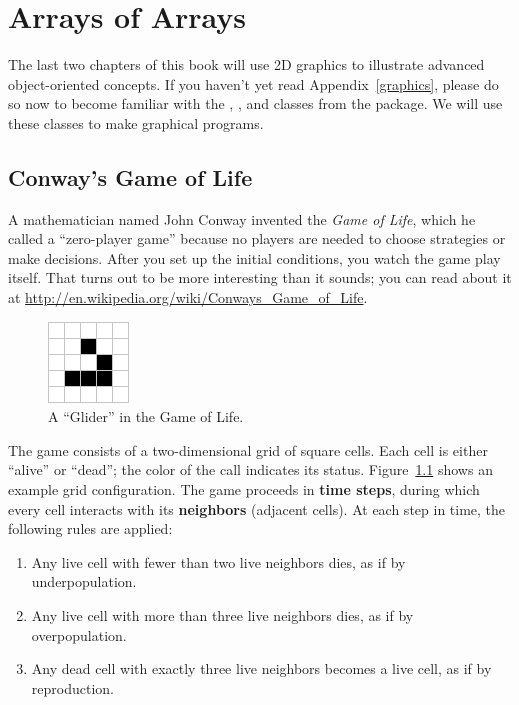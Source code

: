\chapter{Arrays of Arrays}

The last two chapters of this book will use 2D graphics to illustrate advanced object-oriented concepts.
If you haven't yet read Appendix~\ref{graphics}, please do so now to become familiar with the , , and  classes from the  package.
We will use these classes to make graphical programs.


\section{Conway's Game of Life}

A mathematician named John Conway invented the {\it Game of Life}, which he called a ``zero-player game'' because no players are needed to choose strategies or make decisions.
After you set up the initial conditions, you watch the game play itself.
That turns out to be more interesting than it sounds; you can read about it at \url{http://en.wikipedia.org/wiki/Conways_Game_of_Life}.

\begin{figure}[!ht]
\begin{center}
\includegraphics{figs/glider.png}
\caption{A ``Glider'' in the Game of Life.}
\label{fig:glider}
\end{center}
\end{figure}

The game consists of a two-dimensional grid of square cells.
Each cell is either ``alive'' or ``dead''; the color of the call indicates its status.
Figure~\ref{fig:glider} shows an example grid configuration.
The game proceeds in {\bf time steps}, during which every cell interacts with its {\bf neighbors} (adjacent cells).
At each step in time, the following rules are applied:

\begin{enumerate}
\item Any live cell with fewer than two live neighbors dies, as if by underpopulation.
\item Any live cell with more than three live neighbors dies, as if by overpopulation.
\item Any dead cell with exactly three live neighbors becomes a live cell, as if by reproduction.
\end{enumerate}

